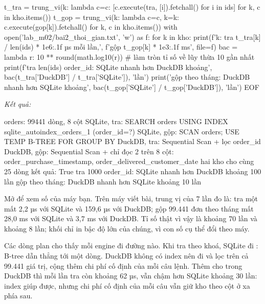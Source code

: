 \begin{codeblock}
t_tra = trung_vi({k: lambda c=c: [c.execute(tra, [i]).fetchall() for i in ids]
                  for k, c in kho.items()})
t_gop = trung_vi({k: lambda c=c, k=k: c.execute(gop[k]).fetchall()
                  for k, c in kho.items()})
with open('lab_m02/bai2_thoi_gian.txt', 'w') as f:
    for k in kho:
        print(f'{k}: tra {t_tra[k] / len(ids) * 1e6:.1f} µs mỗi lần,',
              f'gộp {t_gop[k] * 1e3:.1f} ms', file=f)
bac = lambda r: 10 ** round(math.log10(r))  # làm tròn tỉ số về lũy thừa 10 gần nhất
print(f'tra {len(ids)} order_id: SQLite nhanh hơn DuckDB khoảng',
      bac(t_tra['DuckDB'] / t_tra['SQLite']), 'lần')
print('gộp theo tháng: DuckDB nhanh hơn SQLite khoảng',
      bac(t_gop['SQLite'] / t_gop['DuckDB']), 'lần')
EOF
\end{codeblock}
\textit{Kết quả:}
\begin{codeblock}
orders: 99441 dòng, 8 cột
SQLite, tra: SEARCH orders USING INDEX sqlite_autoindex_orders_1 (order_id=?)
SQLite, gộp: SCAN orders; USE TEMP B-TREE FOR GROUP BY
DuckDB, tra: Sequential Scan + lọc order_id
DuckDB, gộp: Sequential Scan + chỉ đọc 2 trên 8 cột:
  order_purchase_timestamp, order_delivered_customer_date
hai kho cho cùng 25 dòng kết quả: True
tra 1000 order_id: SQLite nhanh hơn DuckDB khoảng 100 lần
gộp theo tháng: DuckDB nhanh hơn SQLite khoảng 10 lần
\end{codeblock}

Mở  để xem số của máy bạn. Trên máy viết bài, trung vị của 7 lần đo là: tra một  mất 2,2 µs với SQLite và 159,6 µs với DuckDB; gộp 99.441 đơn theo tháng mất 28,0 ms với SQLite và 3,7 ms với DuckDB. Tỉ số thật vì vậy là khoảng 70 lần và khoảng 8 lần; khối chỉ in bậc độ lớn của chúng, vì con số cụ thể đổi theo máy.

Các dòng plan cho thấy mỗi engine đi đường nào. Khi tra theo khoá, SQLite đi : B-tree dẫn thẳng tới một dòng. DuckDB không có index nên đi  và lọc  trên cả 99.441 giá trị, cộng thêm chi phí cố định của mỗi câu lệnh. Thêm  cho  trong DuckDB thì mỗi lần tra còn khoảng 62 µs, vẫn chậm hơn SQLite khoảng 30 lần: index giúp được, nhưng chi phí cố định của mỗi câu vẫn giữ kho theo cột ở xa phía sau.

